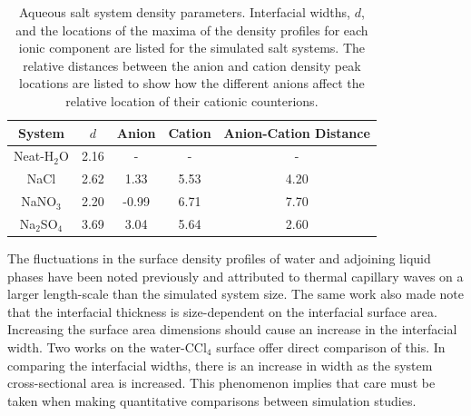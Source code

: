 \begin{table}[htdp]
	\begin{center}
	\begin{tabular}{|c||c|c|c|c|}
		\hline
		System & $d$ & Anion & Cation & Anion-Cation Distance \\ \hline
		Neat-H$_2$O & 2.16 & - & - & - \\ 
		NaCl & 2.62 & 1.33 & 5.53 & 4.20 \\
		NaNO$_3$ & 2.20 & -0.99 & 6.71 & 7.70 \\
		Na$_2$SO$_4$ & 3.69 & 3.04 & 5.64 & 2.60 \\
		\hline
	\end{tabular}
	\end{center}
	\caption{Aqueous salt system density parameters. Interfacial widths, $d$, and the locations of the maxima of the density profiles for each ionic component are listed for the simulated salt systems. The relative distances between the anion and cation density peak locations are listed to show how the different anions affect the relative location of their cationic counterions.}
	\label{system-params}
\end{table}

The fluctuations in the surface density profiles of water and adjoining liquid phases have been noted previously and attributed to thermal capillary waves on a larger length-scale than the simulated system size.\cite{Chang1996} The same work also made note that the interfacial thickness is size-dependent on the interfacial surface area. Increasing the surface area dimensions should cause an increase in the interfacial width. Two works on the water-CCl$_4$ surface offer direct comparison of this.\cite{Chang1996,Hore2008} In comparing the interfacial widths, there is an increase in width as the system cross-sectional area is increased. This phenomenon implies that care must be taken when making quantitative comparisons between simulation studies.


